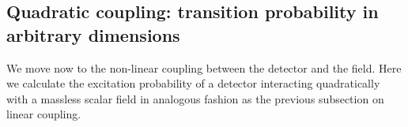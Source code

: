 \documentclass[11pt,prd,onecolumn,superscriptaddress,nofootinbib,floatfix,amsmath,amssymb]{revtex4-2}
\begin{document}
    
    
    
   
    
    
    
    	
    	
	
    \subsection{Quadratic coupling: transition probability in arbitrary dimensions}
    
    We move now to the non-linear coupling between the detector and the field. Here we calculate the excitation probability of a detector interacting quadratically with a massless scalar field in analogous fashion as the previous subsection on linear coupling. 
    
\end{document}
